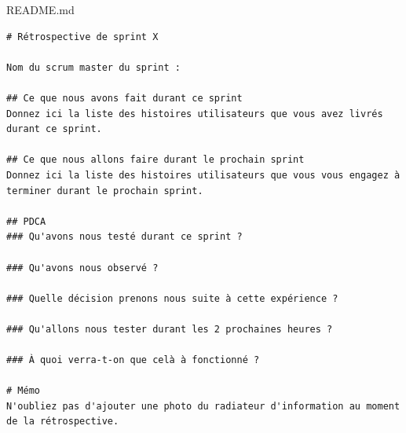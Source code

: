 \documentclass{beamer}
\begin{document}
\begin{frame}[fragile]{README.md}
  \tiny
  \begin{verbatim}
# Rétrospective de sprint X

Nom du scrum master du sprint : 

## Ce que nous avons fait durant ce sprint
Donnez ici la liste des histoires utilisateurs que vous avez livrés durant ce sprint.

## Ce que nous allons faire durant le prochain sprint
Donnez ici la liste des histoires utilisateurs que vous vous engagez à terminer durant le prochain sprint.

## PDCA 
### Qu'avons nous testé durant ce sprint ? 

### Qu'avons nous observé ? 

### Quelle décision prenons nous suite à cette expérience ? 

### Qu'allons nous tester durant les 2 prochaines heures ? 

### À quoi verra-t-on que celà à fonctionné ?

# Mémo
N'oubliez pas d'ajouter une photo du radiateur d'information au moment de la rétrospective.
  \end{verbatim}
\end{frame}
\end{document}
